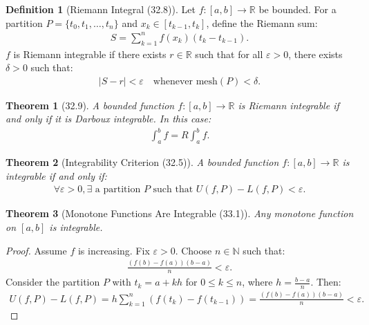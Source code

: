 \documentclass[7pt]{article}
\theoremstyle{definition}
\newtheorem{definition}{Definition}
\theoremstyle{plain}
\newtheorem{theorem}{Theorem}
\begin{document}
\begin{definition}[Riemann Integral (32.8)]
Let $ f : [a, b] \to \mathbb{R} $ be bounded. For a partition $ P = \{t_0, t_1, \ldots, t_n\} $ and $ x_k \in [t_{k-1}, t_k] $, define the Riemann sum:
\begin{align}
S = \sum_{k=1}^n f(x_k)(t_k - t_{k-1}).
\end{align}
$ f $ is Riemann integrable if there exists $ r \in \mathbb{R} $ such that for all $ \varepsilon > 0 $, there exists $ \delta > 0 $ such that:
\begin{align}
|S - r| < \varepsilon \quad \text{whenever mesh}(P) < \delta.
\end{align}
\end{definition}

\begin{theorem}[32.9]
A bounded function $ f : [a, b] \to \mathbb{R} $ is Riemann integrable if and only if it is Darboux integrable. In this case:
\begin{align}
\int_a^b f = R\int_a^b f.
\end{align}
\end{theorem}

\begin{theorem}[Integrability Criterion (32.5)]
A bounded function $ f : [a, b] \to \mathbb{R} $ is integrable if and only if:
\begin{align}
\forall \varepsilon > 0, \exists \text{ a partition } P \text{ such that } U(f, P) - L(f, P) < \varepsilon.
\end{align}
\end{theorem}

\begin{theorem}[Monotone Functions Are Integrable (33.1)]
Any monotone function on $ [a, b] $ is integrable.
\end{theorem}

\begin{proof}
Assume $ f $ is increasing. Fix $ \varepsilon > 0 $. Choose $ n \in \mathbb{N} $ such that:
\begin{align}
\frac{(f(b) - f(a))(b - a)}{n} < \varepsilon.
\end{align}
Consider the partition $ P $ with $ t_k = a + kh $ for $ 0 \leq k \leq n $, where $ h = \frac{b-a}{n} $. Then:
\begin{align}
U(f, P) - L(f, P) = h \sum_{k=1}^n (f(t_k) - f(t_{k-1})) = \frac{(f(b) - f(a))(b - a)}{n} < \varepsilon.
\end{align}
\end{proof}
\end{document}
